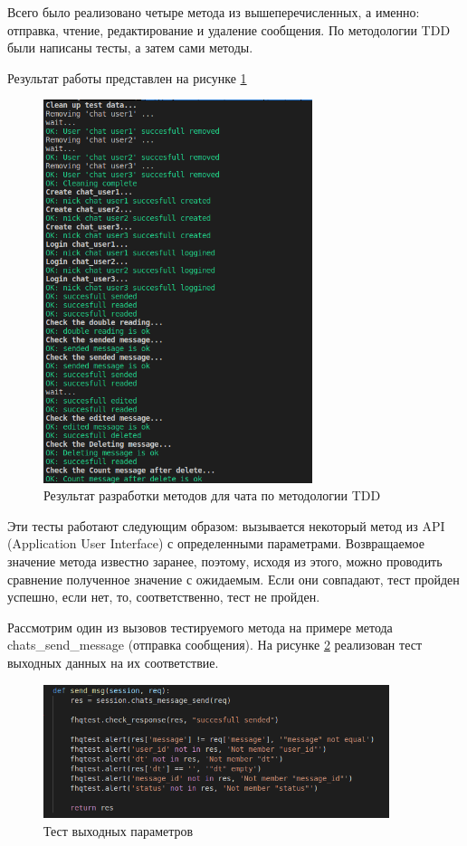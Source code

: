 Всего было реализовано четыре метода из вышеперечисленных, а именно: отправка, чтение, редактирование и удаление сообщения. По методологии TDD были написаны тесты, а затем сами методы. 

Результат работы представлен на рисунке \ref{img:tests}

\begin{figure}[h!]
    \centering
    \includegraphics[width=0.7\textwidth]{images/tests}
    \caption{Результат разработки методов для чата по методологии TDD}
    \label{img:tests}
\end{figure}

Эти тесты работают следующим образом: вызывается некоторый метод из API (Application User Interface) с определенными параметрами. Возвращаемое значение метода известно заранее,
поэтому, исходя из этого, можно проводить сравнение полученное значение с ожидаемым. Если они совпадают, тест пройден успешно, если нет, то, соответственно, тест не пройден. 

Рассмотрим один из вызовов тестируемого метода на примере метода chats\_send\_message (отправка сообщения). На рисунке \ref{img:send_msg} реализован тест выходных данных на их соответствие.

\begin{figure}[h!]
    \centering
    \includegraphics[width=0.9\textwidth]{images/send_msg}
    \caption{Тест выходных параметров}
    \label{img:send_msg}
\end{figure}

